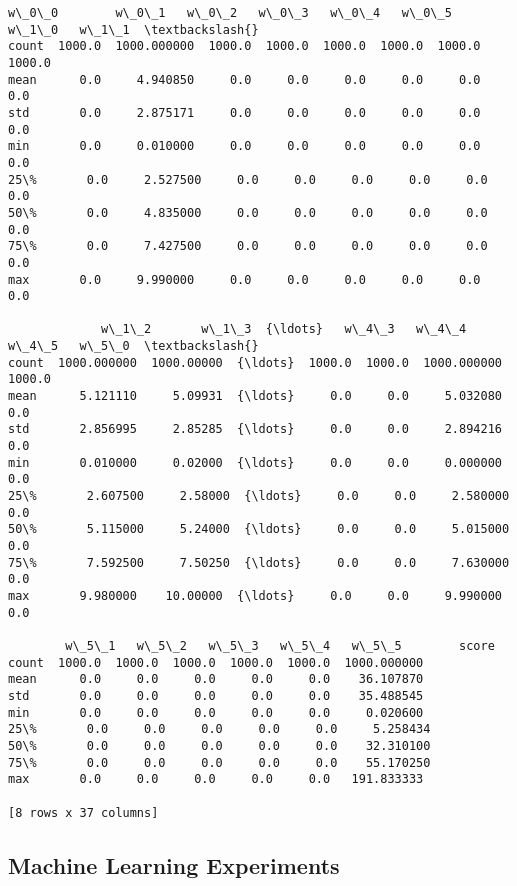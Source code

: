 \documentclass[11pt]{article}
\makeatletter
\newcommand{\boxspacing}{\kern\kvtcb@left@rule\kern\kvtcb@boxsep}
\newcommand{\prompt}[4]{
        \ttfamily\llap{{\color{#2}[#3]:\hspace{3pt}#4}}\vspace{-\baselineskip}
    }
\makeatother
\begin{document}
            \begin{tcolorbox}[breakable, size=fbox, boxrule=.5pt, pad at break*=1mm, opacityfill=0]
\prompt{Out}{outcolor}{15}{\boxspacing}
\begin{Verbatim}[commandchars=\\\{\}]
        w\_0\_0        w\_0\_1   w\_0\_2   w\_0\_3   w\_0\_4   w\_0\_5   w\_1\_0   w\_1\_1  \textbackslash{}
count  1000.0  1000.000000  1000.0  1000.0  1000.0  1000.0  1000.0  1000.0
mean      0.0     4.940850     0.0     0.0     0.0     0.0     0.0     0.0
std       0.0     2.875171     0.0     0.0     0.0     0.0     0.0     0.0
min       0.0     0.010000     0.0     0.0     0.0     0.0     0.0     0.0
25\%       0.0     2.527500     0.0     0.0     0.0     0.0     0.0     0.0
50\%       0.0     4.835000     0.0     0.0     0.0     0.0     0.0     0.0
75\%       0.0     7.427500     0.0     0.0     0.0     0.0     0.0     0.0
max       0.0     9.990000     0.0     0.0     0.0     0.0     0.0     0.0

             w\_1\_2       w\_1\_3  {\ldots}   w\_4\_3   w\_4\_4        w\_4\_5   w\_5\_0  \textbackslash{}
count  1000.000000  1000.00000  {\ldots}  1000.0  1000.0  1000.000000  1000.0
mean      5.121110     5.09931  {\ldots}     0.0     0.0     5.032080     0.0
std       2.856995     2.85285  {\ldots}     0.0     0.0     2.894216     0.0
min       0.010000     0.02000  {\ldots}     0.0     0.0     0.000000     0.0
25\%       2.607500     2.58000  {\ldots}     0.0     0.0     2.580000     0.0
50\%       5.115000     5.24000  {\ldots}     0.0     0.0     5.015000     0.0
75\%       7.592500     7.50250  {\ldots}     0.0     0.0     7.630000     0.0
max       9.980000    10.00000  {\ldots}     0.0     0.0     9.990000     0.0

        w\_5\_1   w\_5\_2   w\_5\_3   w\_5\_4   w\_5\_5        score
count  1000.0  1000.0  1000.0  1000.0  1000.0  1000.000000
mean      0.0     0.0     0.0     0.0     0.0    36.107870
std       0.0     0.0     0.0     0.0     0.0    35.488545
min       0.0     0.0     0.0     0.0     0.0     0.020600
25\%       0.0     0.0     0.0     0.0     0.0     5.258434
50\%       0.0     0.0     0.0     0.0     0.0    32.310100
75\%       0.0     0.0     0.0     0.0     0.0    55.170250
max       0.0     0.0     0.0     0.0     0.0   191.833333

[8 rows x 37 columns]
\end{Verbatim}
\end{tcolorbox}
        
    \subsection{Machine Learning
Experiments}\label{machine-learning-experiments}
\end{document}
